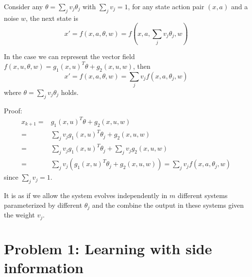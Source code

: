 \documentclass{article}[11pt]
\begin{document}
Consider any $\theta =\sum_{j} v_j \theta_j$ with $\sum_{j}v_j=1$, for
any state action pair $(x,a)$ and a noise $w$, the next state is
\[
x '  = f(x,a,\theta, w)  = f(x,a ,\sum_{j} v_j \theta_j,w  ) 
\]

\begin{claim}
  In the case we can represent the vector field
  $f(x,u,\theta, w)= g_1(x,u)^T\theta + g_2(x,u,w)$, then 
\[
x' = f(x,a,\theta, w) =\sum_{j} v_j f(x,a,\theta_j, w)
\]
where $\theta =\sum_{j} v_j \theta_j$ holds.
\end{claim}
Proof: \begin{align*}
x_{k+1}  = & g_1(x,u)^T  \theta + g_2(x,u,w)\\
 = & \sum_{j} v_j g_1(x,u)^T \theta_j + g_2(x,u,w)  \\
= & \sum_j  v_j g_1(x,u)^T \theta_j + \sum_j v_j g_2(x,u,w)  \\
=  &\sum_j v_j (g_1(x,u)^T\theta_j + g_2(x,u,w)) = \sum_j v_j  f(x,a,\theta_j, w)
\end{align*}
since $\sum_j v_j =1$.

It is as if we allow the system evolves independently in $m$ different
systems parameterized by different $\theta_j$ and the combine the
output in these systems given the weight $v_j$. 




\section{Problem 1: Learning with side information}



\end{document}
